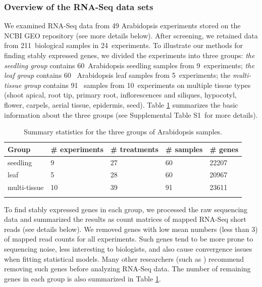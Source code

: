 \documentclass[fleqn,10pt,lineno]{wlpeerj} %
\newcommand{\howmanySamples}{211~}
\newcommand{\howmanylab}{24~}
\newcommand{\howmanyseedlingsample}{60~}
\newcommand{\howmanyleafsample}{60~}
\newcommand{\howmanytissuesample}{91~}
\newcommand{\howmanyseedlingexperiment}{9~}
\newcommand{\howmanyleafexperiment}{5~}
\newcommand{\howmanytissueexperiment}{10~}
\newcommand{\supptableone}{S1~}
\begin{document}
\subsubsection{Overview of the RNA-Seq data sets}
We examined RNA-Seq data from 49 Arabidopsis experiments stored on the NCBI
GEO repository (see more details below). After screening, we retained data
from \howmanySamples biological samples in \howmanylab experiments.  To illustrate our methods
for finding stably expressed genes, we divided the experiments into three
groups: \textit{the seedling group} contains \howmanyseedlingsample Arabidopsis seedling samples
from \howmanyseedlingexperiment experiments; \textit{ the leaf group} contains \howmanyleafsample 
Arabidopsis leaf
samples from \howmanyleafexperiment experiments;  the \textit{multi-tissue group} contains 
\howmanytissuesample
samples from \howmanytissueexperiment experiments on multiple tissue types (shoot apical, root tip,
primary root, inflorescences and siliques, hypocotyl, flower, carpels, aerial
tissue, epidermis, seed).  Table \ref{table:TableSet3} summarizes the basic information about
the three groups (see Supplemental Table \supptableone  for more details).
\begin{table}[!ht]
	\centering
	\caption[Summary statistics for the three groups of Arabidopsis samples]{Summary statistics for 
		the three groups of Arabidopsis samples.}
	\begin{tabular}{lp{2.4cm}p{2.3cm}p{2cm}p{1.5cm}} \hline
		Group & \#  experiments & \# treatments  & \# samples & \# genes \\ \hline
		seedling &   9 &  27 &  60 & 22207 \\ 
		leaf &   5 &  28 &  60 & 20967 \\ 
		multi-tissue &  10 &  39 &  91 & 23611 \\ \hline
		\label{table:TableSet3}
	\end{tabular}
\end{table}

To find stably expressed genes in each group, we processed the raw
sequencing data and summarized the results as count matrices of mapped RNA-Seq
short reads (see details below).  We removed genes with low mean numbers (less
than 3) of mapped read counts for all experiments.  Such genes tend to be more prone to sequencing
noise, less interesting to biologists, and also cause convergence issues when
fitting statistical models. Many other researchers (such as \citealt{anders2013count})
recommend removing such genes before analyzing RNA-Seq data.  The number of
remaining genes in each group is also summarized in Table
\ref{table:TableSet3}.
\end{document}
